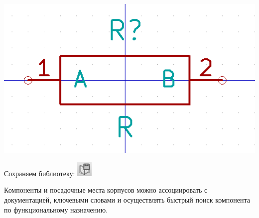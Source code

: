 



\bigskip
\includegraphics[height=0.5\textheight]{kicad/lib29.png}
\bigskip

Сохраняем библиотеку: \includegraphics[height=2em]{kicad/lib30.png}






Компоненты и посадочные места корпусов можно ассоциировать с документацией,
ключевыми словами и осуществлять быстрый поиск компонента по функциональному
назначению.

\secup
